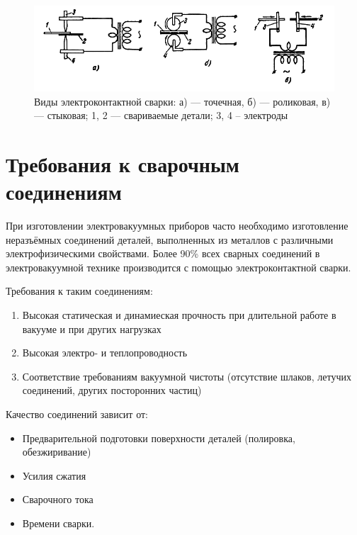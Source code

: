 \documentclass[12pt]{article}
\begin{document}
\begin{figure}[h]
    \centering
    \includegraphics[width=7.5 cm]{weld_types.png}
    \caption{Виды электроконтактной сварки: а) — точечная, б) — роликовая, в) — стыковая; 1, 2 — свариваемые детали; 3, 4 – электроды}
    \label{fig:vac}
\end{figure}

\section{Требования к сварочным соединениям}

При изготовлении электровакуумных приборов часто необходимо изготовление неразъёмных соединений деталей, выполненных из металлов с различными электрофизическими свойствами. Более 90\% всех сварных соединений в электровакуумной технике производится с помощью электроконтактной сварки.\par
Требования к таким соединениям:
\begin{enumerate}
    \item Высокая статическая и динамиеская прочность при длительной работе в вакууме и при других нагрузках
    \item Высокая электро- и теплопроводность
    \item Соответствие требованиям вакуумной чистоты (отсутствие шлаков, летучих соединений, других посторонних частиц)
\end{enumerate}

Качество соединений зависит от:
\begin{itemize}
    \item Предварительной подготовки поверхности деталей (полировка, обезжиривание)
    \item Усилия сжатия
    \item Сварочного тока
    \item Времени сварки.
\end{itemize}
\end{document}
